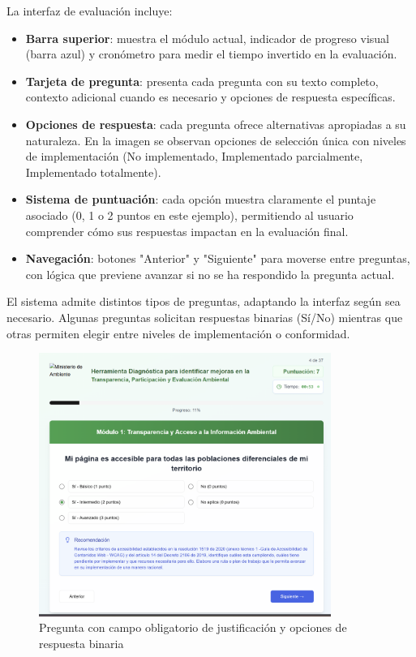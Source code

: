 \documentclass[12pt,a4paper]{report}
\begin{document}
La interfaz de evaluación incluye:
\begin{itemize}[leftmargin=*]
    \item \textbf{Barra superior}: muestra el módulo actual, indicador de progreso visual (barra azul) y cronómetro para medir el tiempo invertido en la evaluación.
    \item \textbf{Tarjeta de pregunta}: presenta cada pregunta con su texto completo, contexto adicional cuando es necesario y opciones de respuesta específicas.
    \item \textbf{Opciones de respuesta}: cada pregunta ofrece alternativas apropiadas a su naturaleza. En la imagen se observan opciones de selección única con niveles de implementación (No implementado, Implementado parcialmente, Implementado totalmente).
    \item \textbf{Sistema de puntuación}: cada opción muestra claramente el puntaje asociado (0, 1 o 2 puntos en este ejemplo), permitiendo al usuario comprender cómo sus respuestas impactan en la evaluación final.
    \item \textbf{Navegación}: botones "Anterior" y "Siguiente" para moverse entre preguntas, con lógica que previene avanzar si no se ha respondido la pregunta actual.
\end{itemize}

El sistema admite distintos tipos de preguntas, adaptando la interfaz según sea necesario. Algunas preguntas solicitan respuestas binarias (Sí/No) mientras que otras permiten elegir entre niveles de implementación o conformidad.

\begin{figure}[h]
    \centering
    \includegraphics[width=0.85\textwidth]{Captura de pantalla 2025-06-26 121754.png}
    \caption{Pregunta con campo obligatorio de justificación y opciones de respuesta binaria}
    \label{fig:justificacion}
\end{figure}
\end{document}
